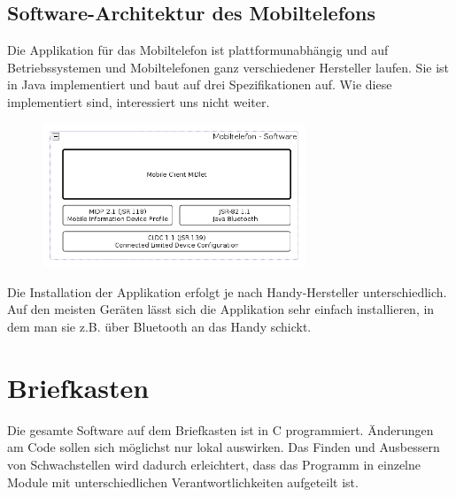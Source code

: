 \documentclass[ngerman]{article}
\begin{document}
\subsection{Software-Architektur des Mobiltelefons}

Die Applikation für das Mobiltelefon ist plattformunabhängig und auf
Betriebssystemen und Mobiltelefonen ganz verschiedener Hersteller laufen. Sie
ist in Java implementiert und baut auf drei Spezifikationen auf. Wie diese
implementiert sind, interessiert uns nicht weiter.

\begin{figure}[h!] \begin{center}
    \includegraphics[width=0.7\textwidth]{media/mobile-client-arch}
\end{center} \end{figure}

Die Installation der Applikation erfolgt je nach Handy-Hersteller
unterschiedlich. Auf den meisten Geräten lässt sich die Applikation sehr
einfach installieren, in dem man sie z.B. über Bluetooth an das Handy schickt.


\section{Briefkasten}

Die gesamte Software auf dem Briefkasten ist in C programmiert. Änderungen am
Code sollen sich möglichst nur lokal auswirken. Das Finden und Ausbessern von
Schwachstellen wird dadurch erleichtert, dass das Programm in einzelne Module
mit unterschiedlichen Verantwortlichkeiten aufgeteilt ist.
\end{document}
